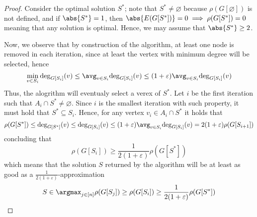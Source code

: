 \documentclass[a4paper, 12pt]{report}
\begin{document}
    \begin{proof}
        Consider the optimal solution $S^*$; note that $S^* \neq \varnothing$ because $\rho(G[\varnothing])$ is not defined, and if $\abs{S^*} = 1$, then $\abs{E(G[S^*])} = 0 \implies \rho(G[S^*]) = 0$ meaning that any solution is optimal. Hence, we may assume that $\abs{S^*} \ge 2$.
        

        Now, we observe that by construction of the algorithm, at least one node is removed in each iteration, since at least the vertex with minimum degree will be selected, hence $$\min_{v \in S_i}{\deg_{G[S_i]}(v)} \le \avg_{v \in S_i}{\deg_{G[S_i]}(v)} \le (1 + \varepsilon) \avg_{v \in S_i}{\deg_{G[S_i]}(v)}$$ Thus, the alogrithm will eventualy select a verex of $S^*$. Let $i$ be the first iteration such that $A_i \cap S^* \neq \varnothing$. Since $i$ is the smallest iteration with such property, it must hold that $S^* \subseteq S_i$. Hence, for any vertex $v_i \in A_i \cap S^*$ it holds that $$\rho(G[S^*]) \le \deg_{G[S^*]}(v) \le \deg_{G[S_i]}(v) \le (1 + \varepsilon) \avg_{v \in S_i}{\deg_{G[S_i]}(v)} = 2 (1 + \varepsilon) \rho(G[S_{i + 1}])$$ concluding that $$\rho(G[S_i]) \ge \dfrac{1}{2(1 + \varepsilon)}\rho(G[S^*])$$ which means that the solution $S$ returned by the algorithm will be at least as good as a $\tfrac{1}{2 (1 + \varepsilon)}$-approximation $$S \in \argmax_{j \in [n]}{\rho(G[S_j])} \ge \rho(G[S_i]) \ge \dfrac{1}{2(1 + \varepsilon)} \rho(G[S^*])$$


\end{proof}
\end{document}
